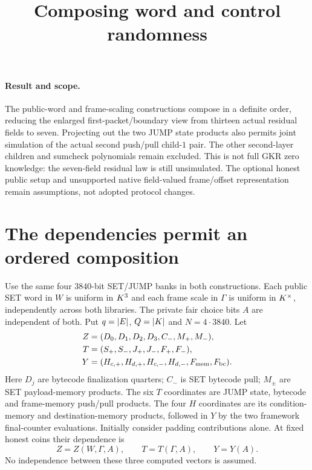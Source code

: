 \documentclass[11pt]{article}
\title{Composing word and control randomness}
\author{}
\date{}
\begin{document}
\maketitle
\vspace{-2em}

\paragraph{Result and scope.} The public-word and frame-scaling constructions compose in a definite order, reducing the enlarged first-packet/boundary view from thirteen actual residual fields to seven. Projecting out the two JUMP state products also permits joint simulation of the actual second push/pull child-$1$ pair. The other second-layer children and sumcheck polynomials remain excluded. This is not full GKR zero knowledge: the seven-field residual law is still unsimulated. The optional honest public setup and unsupported native field-valued frame/offset representation remain assumptions, not adopted protocol changes.

\section{The dependencies permit an ordered composition}

Use the same four $3840$-bit SET/JUMP banks in both constructions. Each public SET word in $W$ is uniform in $K^3$ and each frame scale in $\Gamma$ is uniform in $K^\times$, independently across both libraries. The private fair choice bits $A$ are independent of both. Put $q=|E|$, $Q=|K|$ and $N=4\cdot3840$. Let
\[
\begin{aligned}
 Z&=(D_0,D_1,D_2,D_3,C_-,M_+,M_-),\\
 T&=(S_+,S_-,J_+,J_-,F_+,F_-),\\
 Y&=(H_{c,+},H_{d,+},H_{c,-},H_{d,-},F_{\rm mem},F_{\rm bc}).
\end{aligned}
\]
Here $D_j$ are bytecode finalization quarters; $C_-$ is SET bytecode pull; $M_\pm$ are SET payload-memory products. The six $T$ coordinates are JUMP state, bytecode and frame-memory push/pull products. The four $H$ coordinates are its condition-memory and destination-memory products, followed in $Y$ by the two framework final-counter evaluations. Initially consider padding contributions alone. At fixed honest coins their dependence is
\[
 Z=Z(W,\Gamma,A),\qquad T=T(\Gamma,A),\qquad Y=Y(A).
\]
No independence between these three computed vectors is assumed.
\end{document}
